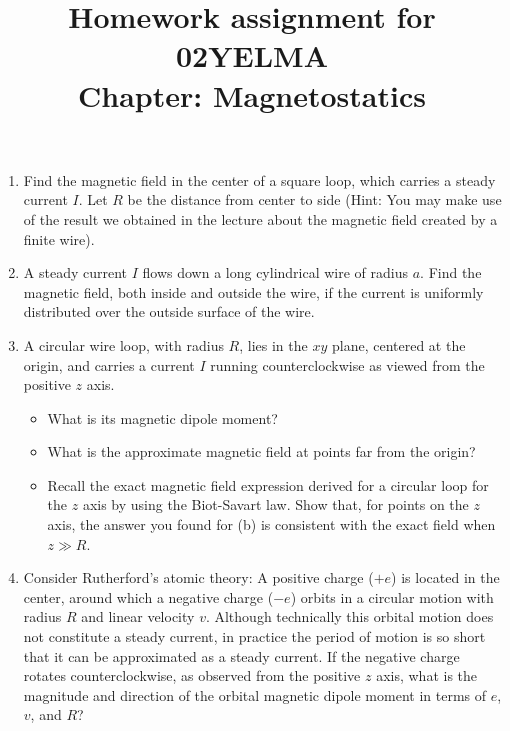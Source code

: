 \documentclass[12pt]{article}
\title{Homework assignment for 02YELMA \\ Chapter: Magnetostatics}
\begin{document}
\date{}
\maketitle
\vspace{-0.8in}

\begin{enumerate}
    \item Find the magnetic field in the center of a square loop, which carries a steady current $I$. Let $R$ be the distance from center to side (Hint: You may make use of the result we obtained in the lecture about the magnetic field created by a finite wire).

    \item A steady current $I$ flows down a long cylindrical wire of radius $a$. Find the magnetic field, both inside and outside the wire, if the current is uniformly distributed over the outside surface of the wire.
    
    \item A circular wire loop, with radius $R$, lies in the $xy$ plane, centered at the origin, and carries a current $I$ running counterclockwise as viewed from the positive $z$ axis.
    \begin{itemize}
        \item[(a)] What is its magnetic dipole moment?
        \item[(b)] What is the approximate magnetic field at points far from the origin?
        \item[(c)] Recall the exact magnetic field expression derived for a circular loop for the $z$ axis by using the Biot-Savart law. Show that, for points on the $z$ axis, the answer you found for (b) is consistent with the exact field when $z\gg R$.
    \end{itemize}
    \item Consider Rutherford's atomic theory: A positive charge ($+e$) is located in the center, around which a negative charge ($-e$) orbits in a circular motion with radius $R$ and linear velocity $v$. Although technically this orbital motion does not constitute a steady current, in practice the period of motion is so short that it can be approximated as a steady current. If the negative charge rotates counterclockwise, as observed from the positive $z$ axis, what is the magnitude and direction of the orbital magnetic dipole moment in terms of $e$, $v$, and $R$?


\end{enumerate}
\end{document}

